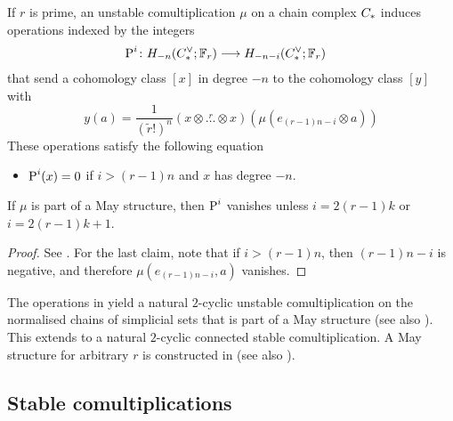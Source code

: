 \begin{proposition}\label{prop:unstable}
	If $r$ is prime, an unstable comultiplication $\mu$ on a chain complex $C_{*}$ induces operations indexed by the integers
	\begin{align*}
		\operatorname{P}^{i}\colon H_{-n}(C^\vee_{*};\mathbb{F}_r)&\longrightarrow H_{-n-i}(C^\vee_{*};\mathbb{F}_r)
	\end{align*}
	that send a cohomology class $[x]$ in degree $-n$ to the cohomology class $[y]$ with
	\[
	y(a) = \frac{1}{(\tilde{r}!)^n}(x\otimes \overset{r}{\ldots}\otimes x)(\mu(e_{(r-1)n-i}\otimes a))
	\]
	These operations satisfy the following equation
	\begin{itemize}
		\item $\operatorname{P}^i(x) = 0$ if $i>(r-1)n$ and $x$ has degree $-n$.
	\end{itemize}
\end{proposition}
\begin{remark} If $\mu$ is part of a May structure, then $\operatorname{P}^i$ vanishes unless $i = 2(r-1)k$ or $i = 2(r-1)k+1$.
\end{remark}

\begin{proof} See \cite{may1970general}.    %
	For the last claim, note that if $i>(r-1)n$, then $(r-1)n-i$ is negative, and therefore $\mu(e_{(r-1)n-i},a)$ vanishes.
\end{proof}
\begin{example}
		The operations in \cite{steenrod1947products} yield a natural $2$-cyclic unstable comultiplication on the normalised chains of simplicial sets that is part of a May structure \cite{medina2021may_st} (see also \cite{gonzalez-diaz1999steenrod, medina2021fast_sq}). This extends to a natural $2$-cyclic connected stable comultiplication. A May structure for arbitrary $r$ is constructed in \cite{medina2021may_st} (see also \cite{brumfiel2023explicit}).
\end{example}



\subsection{Stable comultiplications}\label{s:stable}

